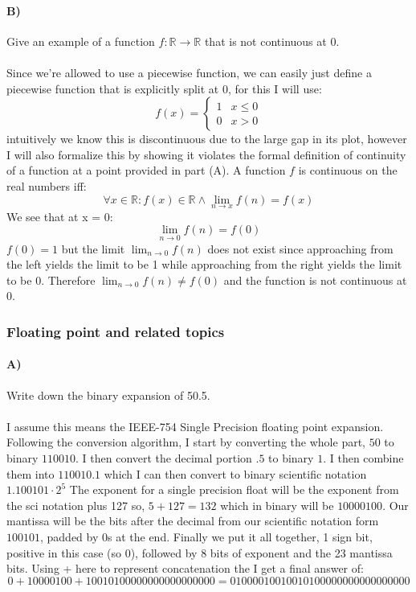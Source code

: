\documentclass{article}
\begin{document}
\paragraph{B)}
Give an example of a function $f:\mathbb{R}\to\mathbb{R}$ that is not continuous at 0.
\paragraph{}
Since we're allowed to use a piecewise function, we can easily just define a piecewise function that is explicitly split at 0, for this I will use:
\[f(x) = \begin{cases} 1 & x\leq0 \\0 & x>0 \end{cases}\]
intuitively we know this is discontinuous due to the large gap in its plot, however I will also formalize this by showing it violates the formal definition of continuity of a function at a point provided in part (A). A function $f$ is continuous on the real numbers iff:
\[\forall x\in\mathbb{R}:f(x)\in\mathbb{R}\wedge\lim_{n\to x}f(n) = f(x)\]
We see that at x = 0:
\[\lim_{n\to 0}f(n) = f(0)\]
$f(0) = 1$ but the limit $\lim_{n\to 0}f(n)$ does not exist since approaching from the left yields the limit to be 1 while approaching from the right yields the limit to be 0. Therefore $\lim_{n\to 0}f(n) \neq f(0)$ and the function is not continuous at 0.

\subsubsection{Floating point and related topics}
\paragraph{A)}
Write down the binary expansion of 50.5.
\paragraph{}
I assume this means the IEEE-754 Single Precision floating point expansion. 
\newline
Following the conversion algorithm, I start by converting the whole part, $50$ to binary $110010$. I then convert the decimal portion $.5$ to binary $1$. I then combine them into $110010.1$ which I can then convert to binary scientific notation $1.100101 \cdot 2^5$ The exponent for a single precision float will be the exponent from the sci notation plus 127 so, $5 + 127 = 132$ which in binary will be $10000100$. Our mantissa will be the bits after the decimal from our scientific notation form $100101$, padded by 0s at the end. Finally we put it all together, 1 sign bit, positive in this case (so 0), followed by 8 bits of exponent and the 23 mantissa bits. Using + here to represent concatenation the I get a final answer of:
\[0 + 10000100 + 10010100000000000000000 = 01000010010010100000000000000000\]
\end{document}
